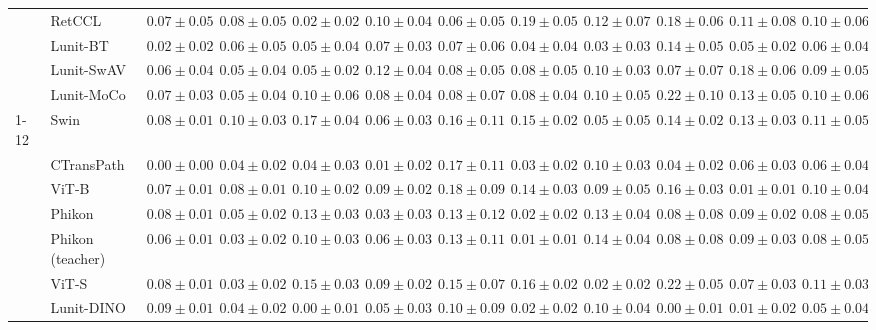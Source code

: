 \begin{tabular}{ll|cccc|c|cccc|c}
 & RetCCL & $0.07 \pm 0.05$ & $0.08 \pm 0.05$ & $\mathbf{0.02 \pm 0.02}$ & $0.10 \pm 0.04$ & $0.06 \pm 0.05$ & $0.19 \pm 0.05$ & $0.12 \pm 0.07$ & $0.18 \pm 0.06$ & $0.11 \pm 0.08$ & $0.10 \pm 0.06$ \\
 & Lunit-BT & $0.02 \pm 0.02$ & $0.06 \pm 0.05$ & $0.05 \pm 0.04$ & $0.07 \pm 0.03$ & $0.07 \pm 0.06$ & $0.04 \pm 0.04$ & $\mathbf{0.03 \pm 0.03}$ & $0.14 \pm 0.05$ & $0.05 \pm 0.02$ & $0.06 \pm 0.04$ \\
 & Lunit-SwAV & $0.06 \pm 0.04$ & $0.05 \pm 0.04$ & $0.05 \pm 0.02$ & $0.12 \pm 0.04$ & $0.08 \pm 0.05$ & $0.08 \pm 0.05$ & $0.10 \pm 0.03$ & $0.07 \pm 0.07$ & $0.18 \pm 0.06$ & $0.09 \pm 0.05$ \\
 & Lunit-MoCo & $0.07 \pm 0.03$ & $0.05 \pm 0.04$ & $0.10 \pm 0.06$ & $0.08 \pm 0.04$ & $0.08 \pm 0.07$ & $0.08 \pm 0.04$ & $0.10 \pm 0.05$ & $0.22 \pm 0.10$ & $0.13 \pm 0.05$ & $0.10 \pm 0.06$ \\
\cline{1-12}
\multirow[t]{12}{*}{Mean pool} & Swin & $0.08 \pm 0.01$ & $0.10 \pm 0.03$ & $0.17 \pm 0.04$ & $0.06 \pm 0.03$ & $0.16 \pm 0.11$ & $0.15 \pm 0.02$ & $0.05 \pm 0.05$ & $0.14 \pm 0.02$ & $0.13 \pm 0.03$ & $0.11 \pm 0.05$ \\
 & CTransPath & $\mathbf{0.00 \pm 0.00}$ & $0.04 \pm 0.02$ & $0.04 \pm 0.03$ & $\mathbf{0.01 \pm 0.02}$ & $0.17 \pm 0.11$ & $0.03 \pm 0.02$ & $0.10 \pm 0.03$ & $0.04 \pm 0.02$ & $0.06 \pm 0.03$ & $0.06 \pm 0.04$ \\
 & ViT-B & $0.07 \pm 0.01$ & $0.08 \pm 0.01$ & $0.10 \pm 0.02$ & $0.09 \pm 0.02$ & $0.18 \pm 0.09$ & $0.14 \pm 0.03$ & $0.09 \pm 0.05$ & $0.16 \pm 0.03$ & $\mathbf{0.01 \pm 0.01}$ & $0.10 \pm 0.04$ \\
 & Phikon & $0.08 \pm 0.01$ & $0.05 \pm 0.02$ & $0.13 \pm 0.03$ & $0.03 \pm 0.03$ & $0.13 \pm 0.12$ & $0.02 \pm 0.02$ & $0.13 \pm 0.04$ & $0.08 \pm 0.08$ & $0.09 \pm 0.02$ & $0.08 \pm 0.05$ \\
 & Phikon (teacher) & $0.06 \pm 0.01$ & $0.03 \pm 0.02$ & $0.10 \pm 0.03$ & $0.06 \pm 0.03$ & $0.13 \pm 0.11$ & $\mathbf{0.01 \pm 0.01}$ & $0.14 \pm 0.04$ & $0.08 \pm 0.08$ & $0.09 \pm 0.03$ & $0.08 \pm 0.05$ \\
 & ViT-S & $0.08 \pm 0.01$ & $0.03 \pm 0.02$ & $0.15 \pm 0.03$ & $0.09 \pm 0.02$ & $0.15 \pm 0.07$ & $0.16 \pm 0.02$ & $\mathbf{0.02 \pm 0.02}$ & $0.22 \pm 0.05$ & $0.07 \pm 0.03$ & $0.11 \pm 0.03$ \\
 & Lunit-DINO & $0.09 \pm 0.01$ & $0.04 \pm 0.02$ & $\mathbf{0.00 \pm 0.01}$ & $0.05 \pm 0.03$ & $\mathbf{0.10 \pm 0.09}$ & $0.02 \pm 0.02$ & $0.10 \pm 0.04$ & $\mathbf{0.00 \pm 0.01}$ & $0.01 \pm 0.02$ & $\mathbf{0.05 \pm 0.04}$ \\

\end{tabular}
